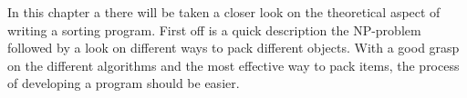 In this chapter a there will be taken a closer look on the theoretical aspect of writing a sorting program. First off is a quick description the NP-problem followed by a look on different ways to pack different objects.
With a good grasp on the different algorithms and the most effective way to pack items, the process of developing a program should be easier.